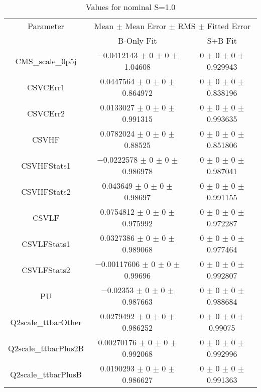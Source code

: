 \begin{table}
\centering
\caption{Values for nominal S=1.0}
\begin{tabular}{ccc}
\toprule
Parameter & \multicolumn{2}{c}{Mean $\pm$ Mean Error $\pm$ RMS $\pm$ Fitted Error}\\
 & B-Only Fit & S+B Fit\\
\midrule
CMS\_scale\_0p5j & \num{-0.0412143} $\pm$ \num{0} $\pm$ \num{0} $\pm$ \num{1.04608} & \num{0} $\pm$ \num{0} $\pm$ \num{0} $\pm$ \num{0.929943}\\
CSVCErr1 & \num{0.0447564} $\pm$ \num{0} $\pm$ \num{0} $\pm$ \num{0.864972} & \num{0} $\pm$ \num{0} $\pm$ \num{0} $\pm$ \num{0.838196}\\
CSVCErr2 & \num{0.0133027} $\pm$ \num{0} $\pm$ \num{0} $\pm$ \num{0.991315} & \num{0} $\pm$ \num{0} $\pm$ \num{0} $\pm$ \num{0.993635}\\
CSVHF & \num{0.0782024} $\pm$ \num{0} $\pm$ \num{0} $\pm$ \num{0.88525} & \num{0} $\pm$ \num{0} $\pm$ \num{0} $\pm$ \num{0.851806}\\
CSVHFStats1 & \num{-0.0222578} $\pm$ \num{0} $\pm$ \num{0} $\pm$ \num{0.986978} & \num{0} $\pm$ \num{0} $\pm$ \num{0} $\pm$ \num{0.987041}\\
CSVHFStats2 & \num{0.043649} $\pm$ \num{0} $\pm$ \num{0} $\pm$ \num{0.98697} & \num{0} $\pm$ \num{0} $\pm$ \num{0} $\pm$ \num{0.991155}\\
CSVLF & \num{0.0754812} $\pm$ \num{0} $\pm$ \num{0} $\pm$ \num{0.975992} & \num{0} $\pm$ \num{0} $\pm$ \num{0} $\pm$ \num{0.972287}\\
CSVLFStats1 & \num{0.0327386} $\pm$ \num{0} $\pm$ \num{0} $\pm$ \num{0.989068} & \num{0} $\pm$ \num{0} $\pm$ \num{0} $\pm$ \num{0.977464}\\
CSVLFStats2 & \num{-0.00117606} $\pm$ \num{0} $\pm$ \num{0} $\pm$ \num{0.99696} & \num{0} $\pm$ \num{0} $\pm$ \num{0} $\pm$ \num{0.992807}\\
PU & \num{-0.02353} $\pm$ \num{0} $\pm$ \num{0} $\pm$ \num{0.987663} & \num{0} $\pm$ \num{0} $\pm$ \num{0} $\pm$ \num{0.988684}\\
Q2scale\_ttbarOther & \num{0.0279492} $\pm$ \num{0} $\pm$ \num{0} $\pm$ \num{0.986252} & \num{0} $\pm$ \num{0} $\pm$ \num{0} $\pm$ \num{0.99075}\\
Q2scale\_ttbarPlus2B & \num{0.00270176} $\pm$ \num{0} $\pm$ \num{0} $\pm$ \num{0.992068} & \num{0} $\pm$ \num{0} $\pm$ \num{0} $\pm$ \num{0.992996}\\
Q2scale\_ttbarPlusB & \num{0.0190293} $\pm$ \num{0} $\pm$ \num{0} $\pm$ \num{0.986627} & \num{0} $\pm$ \num{0} $\pm$ \num{0} $\pm$ \num{0.991363}\\

\end{tabular}
\end{table}
